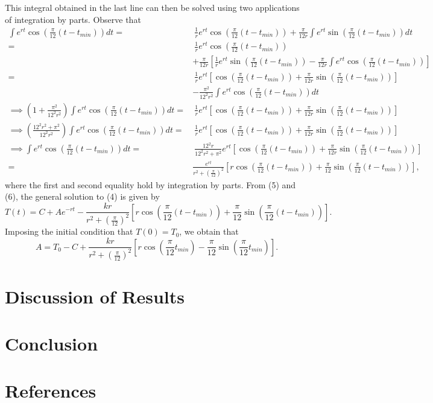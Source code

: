 \documentclass{article}
\begin{document}
This integral obtained in the last line can then be solved using two applications of integration by parts. Observe that
\begin{align*}
    \int e^{rt}\cos\left(\frac{\pi}{12}(t-t_{min})\right)dt=& \ \frac{1}{r}e^{rt}\cos\left(\frac{\pi}{12}(t-t_{min})\right) + \frac{\pi}{12r}\int e^{rt}\sin\left(\frac{\pi}{12}(t-t_{min})\right)dt \\
    =& \ \frac{1}{r}e^{rt}\cos\left(\frac{\pi}{12}(t-t_{min})\right)
    \\
    &+\frac{\pi}{12r}\left[ \frac{1}{r}e^{rt}\sin\left(\frac{\pi}{12}(t-t_{min})\right) - \frac{\pi}{12r}\int e^{rt}\cos\left(\frac{\pi}{12}(t-t_{min})\right)\right]\\
    =& \ \frac{1}{r}e^{rt}\left[\cos\left(\frac{\pi}{12}(t-t_{min})\right) + \frac{\pi}{12r}\sin\left(\frac{\pi}{12}(t-t_{min})\right) \right]\\
    &-\frac{\pi^2}{12^2r^2}\int e^{rt}\cos\left(\frac{\pi}{12}(t-t_{min})\right)dt\\
    \implies \left(1+\frac{\pi^2}{12^2r^2}\right)\int
    e^{rt}\cos\left(\frac{\pi}{12}(t-t_{min})\right)dt =& \ \frac{1}{r}e^{rt}\left[\cos\left(\frac{\pi}{12}(t-t_{min})\right) + \frac{\pi}{12r}\sin\left(\frac{\pi}{12}(t-t_{min})\right) \right]\\
    \implies \left(\frac{12^2r^2+\pi^2}{12^2r^2}\right)\int
    e^{rt}\cos\left(\frac{\pi}{12}(t-t_{min})\right)dt =& \ \frac{1}{r}e^{rt}\left[\cos\left(\frac{\pi}{12}(t-t_{min})\right) + \frac{\pi}{12r}\sin\left(\frac{\pi}{12}(t-t_{min})\right) \right]\\
    \implies \int
    e^{rt}\cos\left(\frac{\pi}{12}(t-t_{min})\right)dt =& \ \frac{12^2r}{12^2r^2+\pi^2}e^{rt}\left[\cos\left(\frac{\pi}{12}(t-t_{min})\right) + \frac{\pi}{12r}\sin\left(\frac{\pi}{12}(t-t_{min})\right) \right]\\
    =& \frac{e^{rt}}{r^2+(\frac{\pi}{12})^2}\left[r\cos\left(\frac{\pi}{12}(t-t_{min})\right) + \frac{\pi}{12}\sin\left(\frac{\pi}{12}(t-t_{min})\right) \right],
\end{align*}
where the first and second equality hold by integration by parts. From (5) and (6), the general solution to (4) is given by
\[T(t) = C+Ae^{-rt} - \frac{kr}{r^2+(\frac{\pi}{12})^2}\left[r\cos\left(\frac{\pi}{12}(t-t_{min})\right) + \frac{\pi}{12}\sin\left(\frac{\pi}{12}(t-t_{min})\right) \right].\]
Imposing the initial condition that \(T(0)=T_0\), we obtain that
\[A=T_0-C+\frac{kr}{r^2+(\frac{\pi}{12})^2}\left[r\cos\left(\frac{\pi}{12}t_{min}\right) - \frac{\pi}{12}\sin\left(\frac{\pi}{12}t_{min}\right) \right].\]
\section{Discussion of Results}

\section{Conclusion}

\section{References}
\end{document}
